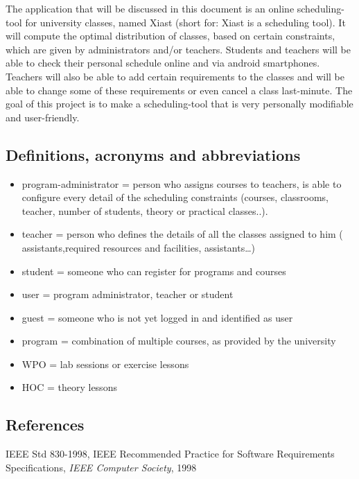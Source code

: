 \documentclass[12pt]{article}
\begin{document}
The application that will be discussed in this document is an online
scheduling-tool for university classes, named Xiast (short for: Xiast is
a scheduling tool). It will compute the optimal distribution of classes,
based on certain constraints, which are given by administrators and/or
teachers. Students and teachers will be able to check their personal
schedule online and via android smartphones. Teachers will also be able
to add certain requirements to the classes and will be able to change
some of these requirements or even cancel a class last-minute. The goal
of this project is to make a scheduling-tool that is very personally
modifiable and user-friendly.

\subsection{Definitions, acronyms and
abbreviations}\label{definitions-acronyms-and-abbreviations}

\begin{itemize}
\itemsep1pt\parskip0pt
\item
  program-administrator = person who assigns courses to teachers, is
  able to configure every detail of the scheduling constraints (courses,
  classrooms, teacher, number of students, theory or practical
  classes..).
\item
  teacher = person who defines the details of all the classes assigned
  to him ( assistants,required resources and facilities,
  assistants\ldots{})
\item
  student = someone who can register for programs and courses
\item
  user = program administrator, teacher or student
\item
  guest = someone who is not yet logged in and identified as user
\item
  program = combination of multiple courses, as provided by the
  university
\item
  WPO = lab sessions or exercise lessons
\item
  HOC = theory lessons
\end{itemize}

\subsection{References}\label{references}

IEEE Std 830-1998, IEEE Recommended Practice for Software Requirements
Specifications, \emph{IEEE Computer Society}, 1998
\end{document}
